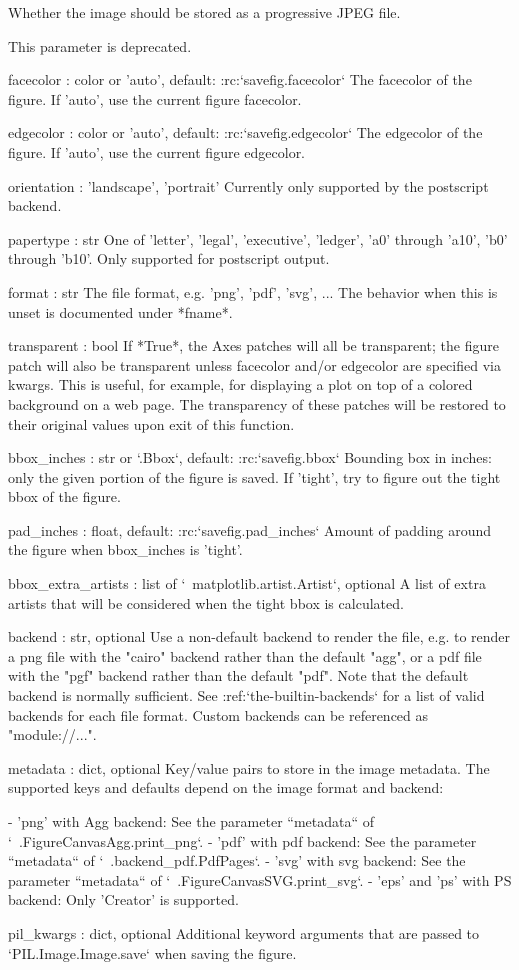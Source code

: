 \begin{DoxyVerb}
    Whether the image should be stored as a progressive JPEG file.

    This parameter is deprecated.

facecolor : color or 'auto', default: :rc:`savefig.facecolor`
    The facecolor of the figure.  If 'auto', use the current figure
    facecolor.

edgecolor : color or 'auto', default: :rc:`savefig.edgecolor`
    The edgecolor of the figure.  If 'auto', use the current figure
    edgecolor.

orientation : {'landscape', 'portrait'}
    Currently only supported by the postscript backend.

papertype : str
    One of 'letter', 'legal', 'executive', 'ledger', 'a0' through
    'a10', 'b0' through 'b10'. Only supported for postscript
    output.

format : str
    The file format, e.g. 'png', 'pdf', 'svg', ... The behavior when
    this is unset is documented under *fname*.

transparent : bool
    If *True*, the Axes patches will all be transparent; the
    figure patch will also be transparent unless facecolor
    and/or edgecolor are specified via kwargs.
    This is useful, for example, for displaying
    a plot on top of a colored background on a web page.  The
    transparency of these patches will be restored to their
    original values upon exit of this function.

bbox_inches : str or `.Bbox`, default: :rc:`savefig.bbox`
    Bounding box in inches: only the given portion of the figure is
    saved.  If 'tight', try to figure out the tight bbox of the figure.

pad_inches : float, default: :rc:`savefig.pad_inches`
    Amount of padding around the figure when bbox_inches is 'tight'.

bbox_extra_artists : list of `~matplotlib.artist.Artist`, optional
    A list of extra artists that will be considered when the
    tight bbox is calculated.

backend : str, optional
    Use a non-default backend to render the file, e.g. to render a
    png file with the "cairo" backend rather than the default "agg",
    or a pdf file with the "pgf" backend rather than the default
    "pdf".  Note that the default backend is normally sufficient.  See
    :ref:`the-builtin-backends` for a list of valid backends for each
    file format.  Custom backends can be referenced as "module://...".

metadata : dict, optional
    Key/value pairs to store in the image metadata. The supported keys
    and defaults depend on the image format and backend:

    - 'png' with Agg backend: See the parameter ``metadata`` of
      `~.FigureCanvasAgg.print_png`.
    - 'pdf' with pdf backend: See the parameter ``metadata`` of
      `~.backend_pdf.PdfPages`.
    - 'svg' with svg backend: See the parameter ``metadata`` of
      `~.FigureCanvasSVG.print_svg`.
    - 'eps' and 'ps' with PS backend: Only 'Creator' is supported.

pil_kwargs : dict, optional
    Additional keyword arguments that are passed to
    `PIL.Image.Image.save` when saving the figure.
\end{DoxyVerb}
